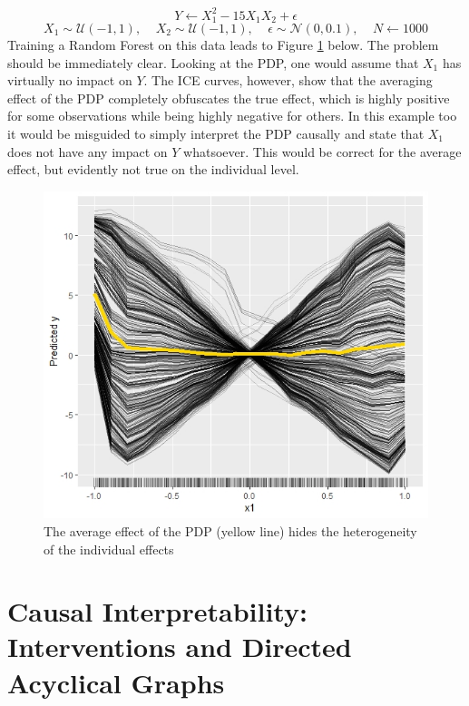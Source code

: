 \documentclass[
]{krantz}
\begin{document}
\[ Y \leftarrow  X_{1}^2 - 15X_{1}X_2 + \epsilon \]
\[ X_1 \sim \mathcal{U}(-1, 1), \ \ \ \ \ X_2 \sim \mathcal{U}(-1, 1), \ \ \ \ \ \epsilon \sim \mathcal{N}(0,0.1), \ \ \ \ \ N \leftarrow 1000    \]
Training a Random Forest on this data leads to Figure \ref{fig:Figure2} below. The problem should be immediately clear. Looking at the PDP, one would assume that \(X_1\) has virtually no impact on \(Y\). The ICE curves, however, show that the averaging effect of the PDP completely obfuscates the true effect, which is highly positive for some observations while being highly negative for others. In this example too it would be misguided to simply interpret the PDP causally and state that \(X_1\) does not have any impact on \(Y\) whatsoever. This would be correct for the average effect, but evidently not true on the individual level.

\begin{figure}

\includegraphics[width=1\linewidth]{images/avg_vs_individual} \hfill{}

\caption{The average effect of the PDP (yellow line) hides the heterogeneity of the individual effects }\label{fig:Figure2}
\end{figure}

\hypertarget{causal-interpretability-interventions-and-directed-acyclical-graphs}{%
\section{Causal Interpretability: Interventions and Directed Acyclical Graphs}\label{causal-interpretability-interventions-and-directed-acyclical-graphs}}
\end{document}
